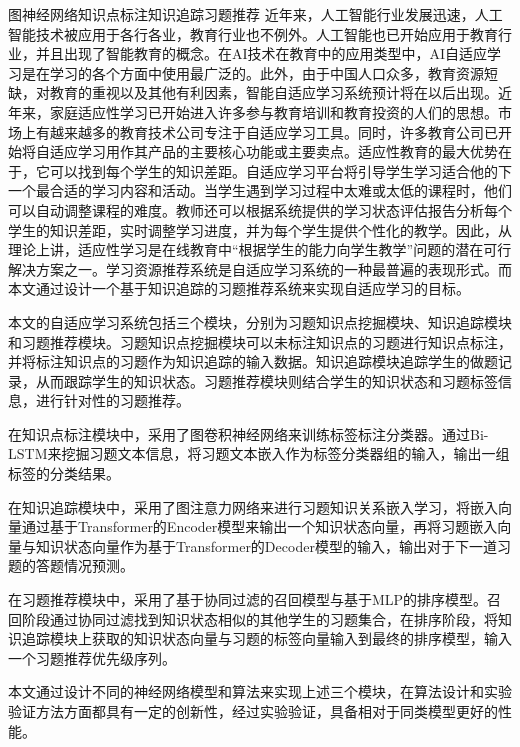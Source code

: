 
\begin{abstractC}{图神经网络}{知识点标注}{知识追踪}{习题推荐}{}
    近年来，人工智能行业发展迅速，人工智能技术被应用于各行各业，教育行业也不例外。人工智能也已开始应用于教育行业，并且出现了智能教育的概念。在AI技术在教育中的应用类型中，AI自适应学习是在学习的各个方面中使用最广泛的。此外，由于中国人口众多，教育资源短缺，对教育的重视以及其他有利因素，智能自适应学习系统预计将在以后出现。近年来，家庭适应性学习已开始进入许多参与教育培训和教育投资的人们的思想。市场上有越来越多的教育技术公司专注于自适应学习工具。同时，许多教育公司已开始将自适应学习用作其产品的主要核心功能或主要卖点。适应性教育的最大优势在于，它可以找到每个学生的知识差距。自适应学习平台将引导学生学习适合他的下一个最合适的学习内容和活动。当学生遇到学习过程中太难或太低的课程时，他们可以自动调整课程的难度。教师还可以根据系统提供的学习状态评估报告分析每个学生的知识差距，实时调整学习进度，并为每个学生提供个性化的教学。因此，从理论上讲，适应性学习是在线教育中“根据学生的能力向学生教学”问题的潜在可行解决方案之一。学习资源推荐系统是自适应学习系统的一种最普遍的表现形式。而本文通过设计一个基于知识追踪的习题推荐系统来实现自适应学习的目标。

    本文的自适应学习系统包括三个模块，分别为习题知识点挖掘模块、知识追踪模块和习题推荐模块。习题知识点挖掘模块可以未标注知识点的习题进行知识点标注，并将标注知识点的习题作为知识追踪的输入数据。知识追踪模块追踪学生的做题记录，从而跟踪学生的知识状态。习题推荐模块则结合学生的知识状态和习题标签信息，进行针对性的习题推荐。

    在知识点标注模块中，采用了图卷积神经网络来训练标签标注分类器。通过Bi-LSTM来挖掘习题文本信息，将习题文本嵌入作为标签分类器组的输入，输出一组标签的分类结果。

    在知识追踪模块中，采用了图注意力网络来进行习题知识关系嵌入学习，将嵌入向量通过基于Transformer的Encoder模型来输出一个知识状态向量，再将习题嵌入向量与知识状态向量作为基于Transformer的Decoder模型的输入，输出对于下一道习题的答题情况预测。

    在习题推荐模块中，采用了基于协同过滤的召回模型与基于MLP的排序模型。召回阶段通过协同过滤找到知识状态相似的其他学生的习题集合，在排序阶段，将知识追踪模块上获取的知识状态向量与习题的标签向量输入到最终的排序模型，输入一个习题推荐优先级序列。

    本文通过设计不同的神经网络模型和算法来实现上述三个模块，在算法设计和实验验证方法方面都具有一定的创新性，经过实验验证，具备相对于同类模型更好的性能。
\end{abstractC}
